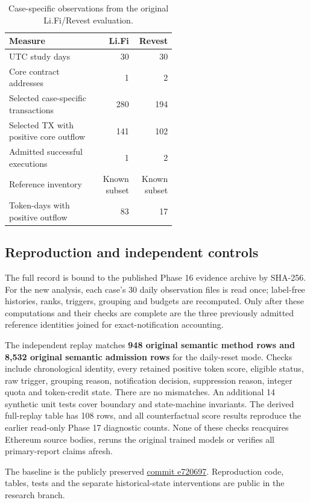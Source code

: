 \documentclass[preprint,12pt,authoryear]{elsarticle}
\begin{document}
\begin{table}[htbp]\centering\small\caption{Case-specific observations from the original Li.Fi/Revest evaluation.}\label{tab:cases}
\begin{tabular}{p{0.55\linewidth}rr}\toprule
Measure & Li.Fi & Revest \\
\midrule
UTC study days & 30 & 30 \\
Core contract addresses & 1 & 2 \\
Selected case-specific transactions & 280 & 194 \\
Selected TX with positive core outflow & 141 & 102 \\
Admitted successful executions & 1 & 2 \\
Reference inventory & Known subset & Known subset \\
Token-days with positive outflow & 83 & 17 \\
\bottomrule\end{tabular}\end{table}

\subsection{Reproduction and independent controls}\label{reproduction-and-independent-controls}

The full record is bound to the published Phase 16 evidence archive by SHA-256. For the new analysis, each case's 30 daily observation files is read once; label-free histories, ranks, triggers, grouping and budgets are recomputed. Only after these computations and their checks are complete are the three previously admitted reference identities joined for exact-notification accounting.

The independent replay matches \textbf{948 original semantic method rows and 8,532 original semantic admission rows} for the daily-reset mode. Checks include chronological identity, every retained positive token score, eligible status, raw trigger, grouping reason, notification decision, suppression reason, integer quota and token-credit state. There are no mismatches. An additional 14 synthetic unit tests cover boundary and state-machine invariants. The derived full-replay table has 108 rows, and all counterfactual score results reproduce the earlier read-only Phase 17 diagnostic counts. None of these checks reacquires Ethereum source bodies, reruns the original trained models or verifies all primary-report claims afresh.

The baseline is the publicly preserved \href{https://github.com/KuznetsovKarazin/blockchain-analytics-lab/commit/e720697bc3986dd291a7047c580cf973ae6e5567}{commit e720697}. Reproduction code, tables, tests and the separate historical-state interventions are public in the research branch.
\end{document}

